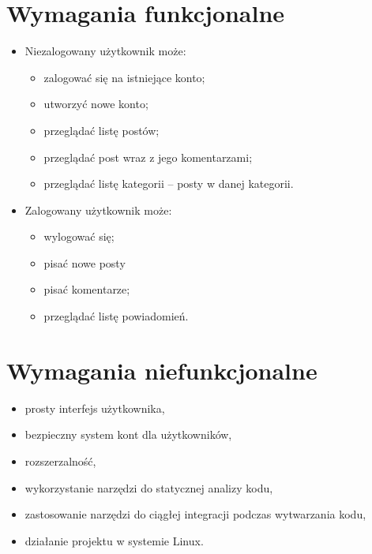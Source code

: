 \documentclass[declaration,shortabstract]{iithesis}
\begin{document}
\section{Wymagania funkcjonalne}

\begin{itemize}
    \item Niezalogowany użytkownik może: 
    \begin{itemize}
         \item zalogować się na istniejące konto;
         \item utworzyć nowe konto;
         \item przeglądać listę postów;
         \item przeglądać post wraz z jego komentarzami;
         \item przeglądać listę kategorii – posty w danej kategorii.
    \end{itemize}
    \item Zalogowany użytkownik może:
        \begin{itemize}
            \item wylogować się;
            \item pisać nowe posty
            \item pisać komentarze;
            \item przeglądać listę powiadomień.
        \end{itemize}
\end{itemize}

\section{Wymagania niefunkcjonalne}
\begin{itemize}
    \item prosty interfejs użytkownika,
    \item bezpieczny system kont dla użytkowników,
    \item rozszerzalność,
    \item wykorzystanie narzędzi do statycznej analizy kodu,
    \item zastosowanie narzędzi do ciągłej integracji podczas wytwarzania kodu,
    \item działanie projektu w systemie Linux.
    
\end{itemize}

\end{document}
